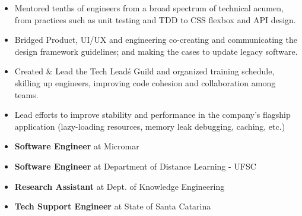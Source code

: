\documentclass[10pt,a4paper]{altacv}
\begin{document}
\begin{itemize}
\item Mentored tenths of engineers from a broad spectrum of technical acumen, from practices such as unit testing and TDD to CSS flexbox and API design.
\item Bridged Product, UI/UX and engineering co-creating and communicating the design framework guidelines; and making the cases to update legacy software.
\item Created \& Lead the Tech Lead\'s Guild and organized training schedule, skilling up engineers, improving code cohesion and collaboration among teams.
\item Lead efforts to improve stability and performance in the company's flagship application (lazy-loading resources, memory leak debugging, caching, etc.)
\end{itemize}
\divider

\begin{itemize}
\item \textbf{Software Engineer} at Micromar
\item \textbf{Software Engineer} at Department of Distance Learning - UFSC
\item \textbf{Research Assistant} at Dept. of Knowledge Engineering
\item \textbf{Tech Support Engineer} at State of Santa Catarina
\end{itemize}

\clearpage
\end{document}
